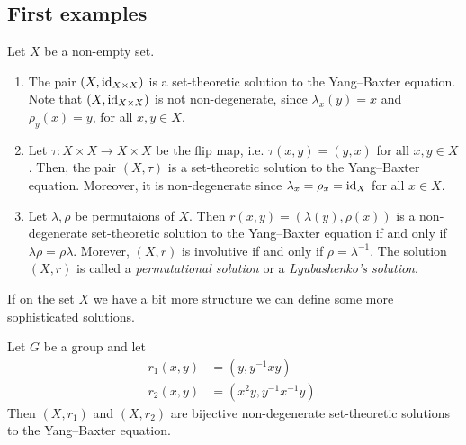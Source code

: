 \subsection{First examples}
    \begin{examples}
        Let $X$ be a non-empty set.  
        \begin{enumerate}
            \item The pair $(X,\operatorname{id}_{X\times X})$ is a  set-theoretic solution to the  Yang--Baxter equation. Note that $(X,\operatorname{id}_{X\times X})$ is not non-degenerate, since $\lambda_x(y)=x$ and $\rho_y(x)=y$, for all $x,y\in X$.
            \item Let $\tau: X \times X \to X \times X$ be the flip map, i.e. $\tau(x,y)=(y,x)$ for all $x,y \in X$. Then, the pair $(X,\tau)$ is a set-theoretic solution to the Yang--Baxter equation. Moreover, it is non-degenerate since $\lambda_x=\rho_x=\operatorname{id}_X$ for all $x\in X$.
            \item Let $\lambda, \rho$ be permutaions of $X$. Then $r(x,y)=(\lambda(y),\rho(x))$ is a
            non-degenerate set-theoretic solution to the Yang--Baxter equation if and only if $\lambda\rho = \rho\lambda$.
            Morever, $(X , r )$ is involutive if and only if $\rho = \lambda^{-1}$. The solution 
            $(X,r)$ is called a \emph{permutational solution} or a \emph{Lyubashenko's solution}.
        \end{enumerate}
    \end{examples}

    If on the set $X$ we have a bit more structure we can define some more sophisticated solutions.
    \begin{example}
        Let $G$ be a group and let
        \begin{align*}
            r_1(x,y) &= (y, y^{-1}xy)\\
            r_2(x,y) &= (x^{2}y, y^{-1}x^{-1}y).
        \end{align*}
        Then $(X,r_1)$ and $(X,r_2)$ are bijective non-degenerate set-theoretic solutions to the Yang--Baxter equation.
    \end{example}



